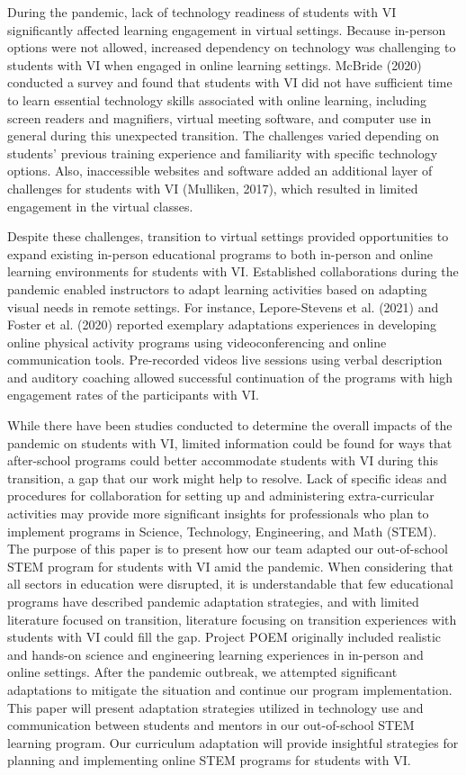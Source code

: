\documentclass[11pt]{sig-alternate}
\begin{document}
\begin{large}
During the pandemic, lack of technology readiness of students with VI significantly affected learning engagement in virtual settings. Because in-person options were not allowed, increased dependency on technology was challenging to students with VI when engaged in online learning settings. McBride (2020) conducted a survey and found that students with VI did not have sufficient time to learn essential technology skills associated with online learning, including screen readers and magnifiers, virtual meeting software, and computer use in general during this unexpected transition. The challenges varied depending on students’ previous training experience and familiarity with specific technology options. Also, inaccessible websites and software added an additional layer of challenges for students with VI (Mulliken, 2017), which resulted in limited engagement in the virtual classes. 

Despite these challenges, transition to virtual settings provided opportunities to expand existing in-person educational programs to both in-person and online learning environments for students with VI. Established collaborations during the pandemic enabled instructors to adapt learning activities based on adapting visual needs in remote settings. For instance, Lepore-Stevens et al. (2021) and Foster et al. (2020) reported exemplary adaptations experiences in developing online physical activity programs using videoconferencing and online communication tools. Pre-recorded videos live sessions using verbal description and auditory coaching allowed successful continuation of the programs with high engagement rates of the participants with VI.

While there have been studies conducted to determine the overall impacts of the pandemic on students with VI, limited information could be found for ways that after-school programs could better accommodate students with VI during this transition, a gap that our work might help to resolve. Lack of specific ideas and procedures for collaboration for setting up and administering extra-curricular activities may provide more significant insights for professionals who plan to implement programs in Science, Technology, Engineering, and Math (STEM). The purpose of this paper is to present how our team adapted our out-of-school STEM program for students with VI amid the pandemic. When considering that all sectors in education were disrupted, it is understandable that few educational programs have described pandemic adaptation strategies, and with limited literature focused on transition, literature focusing on transition experiences with students with VI could fill the gap. Project POEM originally included realistic and hands-on science and engineering learning experiences in in-person and online settings. After the pandemic outbreak, we attempted significant adaptations to mitigate the situation and continue our program implementation. This paper will present adaptation strategies utilized in technology use and communication between students and mentors in our out-of-school STEM learning program. Our curriculum adaptation will provide insightful strategies for planning and implementing online STEM programs for students with VI.


\end{large}
\end{document}
